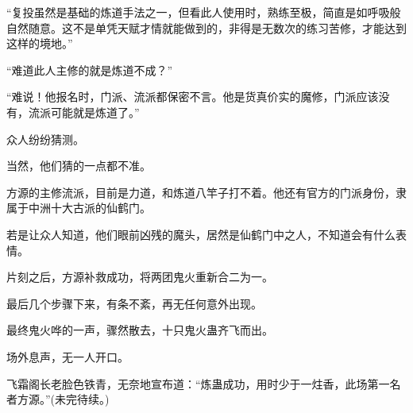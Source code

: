 \begin{this_body}
“复投虽然是基础的炼道手法之一，但看此人使用时，熟练至极，简直是如呼吸般自然随意。这不是单凭天赋才情就能做到的，非得是无数次的练习苦修，才能达到这样的境地。”

“难道此人主修的就是炼道不成？”

“难说！他报名时，门派、流派都保密不言。他是货真价实的魔修，门派应该没有，流派可能就是炼道了。”

众人纷纷猜测。

当然，他们猜的一点都不准。

方源的主修流派，目前是力道，和炼道八竿子打不着。他还有官方的门派身份，隶属于中洲十大古派的仙鹤门。

若是让众人知道，他们眼前凶残的魔头，居然是仙鹤门中之人，不知道会有什么表情。

片刻之后，方源补救成功，将两团鬼火重新合二为一。

最后几个步骤下来，有条不紊，再无任何意外出现。

最终鬼火哗的一声，骤然散去，十只鬼火蛊齐飞而出。

场外息声，无一人开口。

飞霜阁长老脸色铁青，无奈地宣布道：“炼蛊成功，用时少于一炷香，此场第一名者方源。”(未完待续。)

\end{this_body}


